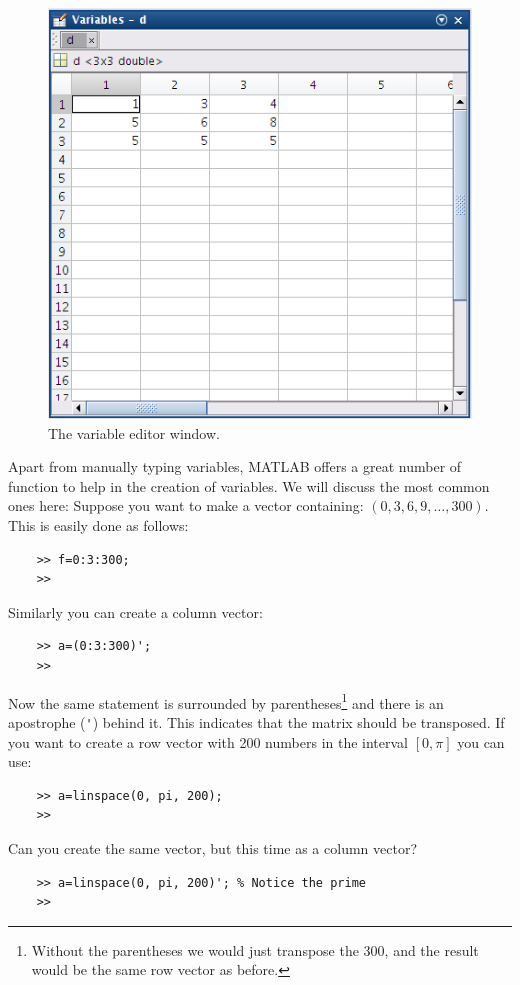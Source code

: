 \documentclass[a4paper]{article}
\begin{document}
\begin{figure}
  \centering
  \includegraphics[width=.5\linewidth]{vareditor.png}
    \caption{The variable editor window.}
    \label{fig:vareditor}
\end{figure}

Apart from manually typing variables, MATLAB offers a great number of function to help in the creation of variables. We will discuss the most common ones here:
Suppose you want to make a vector containing: $(0, 3, 6, 9, \ldots, 300)$. This is easily done as follows:
\begin{lstlisting}
    >> f=0:3:300;
    >> 
\end{lstlisting}
Similarly you can create a column vector:
\begin{lstlisting}
    >> a=(0:3:300)';
    >> 
\end{lstlisting}
Now the same statement is surrounded by parentheses\footnote{Without the parentheses we would just transpose the 300, and the result would be the same row vector as before.} and there is an apostrophe (\lstinline='=) behind it. This indicates that the matrix should be transposed.
If you want to create a row vector with 200 numbers in the interval $[0,\pi]$ you can use:
\begin{lstlisting}
    >> a=linspace(0, pi, 200);
    >>
\end{lstlisting}

\begin{exercise}
  Can you create the same vector, but this time as a column vector?
\end{exercise}
\begin{solution}
  \begin{lstlisting}
    >> a=linspace(0, pi, 200)'; % Notice the prime 
    >>
  \end{lstlisting}
\end{solution}
\end{document}
